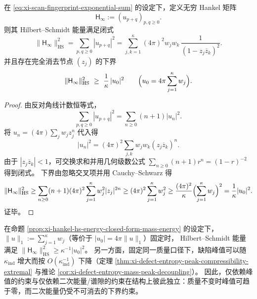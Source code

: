 \begin{proposition}\label{prop:xi-hankel-hs-energy-closed-form-mass-energy}
在 \eqref{eq:xi-scan-fingerprint-exponential-sum} 的设定下，定义无穷 Hankel 矩阵
\[
\mathsf H_\infty:=(u_{p+q})_{p,q\ge 0}.
\]
则其 Hilbert--Schmidt 能量满足闭式
\[
\|\mathsf H_\infty\|_{\mathrm{HS}}^2
=\sum_{p,q\ge 0}|u_{p+q}|^2
=\sum_{j,k=1}^{\kappa}(4\pi)^2 w_j w_k\,\frac{1}{(1-z_j\overline z_k)^2}.
\]
并且存在完全消去节点 \((z_j)\) 的下界
\[
\|\mathsf H_\infty\|_{\mathrm{HS}}^2\ \ge\ \frac{1}{\kappa}\,|u_0|^2
\qquad\Bigl(u_0=4\pi\sum_{j=1}^{\kappa}w_j\Bigr).
\]
\end{proposition}
\begin{proof}
由反对角线计数恒等式，
\[
\sum_{p,q\ge 0}|u_{p+q}|^2=\sum_{n\ge 0}(n+1)|u_n|^2.
\]
将 \(u_n=(4\pi)\sum_j w_j z_j^n\) 代入得
\[
|u_n|^2=(4\pi)^2\sum_{j,k}w_j w_k (z_j\overline z_k)^n.
\]
由于 \(|z_j\overline z_k|<1\)，可交换求和并用几何级数公式
\(
\sum_{n\ge 0}(n+1)r^n=(1-r)^{-2}
\)
得到闭式。
下界由忽略交叉项并用 Cauchy--Schwarz 得
\[
\|\mathsf H_\infty\|_{\mathrm{HS}}^2
\ge \sum_{n\ge 0}(n+1)(4\pi)^2\sum_{j=1}^{\kappa}w_j^2|z_j|^{2n}
\ge (4\pi)^2\sum_{j=1}^{\kappa}w_j^2
\ge \frac{(4\pi)^2}{\kappa}\Bigl(\sum_{j=1}^{\kappa}w_j\Bigr)^2
=\frac{1}{\kappa}|u_0|^2.
\]
证毕。
\end{proof}

\begin{corollary}[峰值与二次能量约束的独立性]\label{cor:xi-peak-vs-energy-audit-independence}
在命题 \ref{prop:xi-hankel-hs-energy-closed-form-mass-energy} 的设定下，
\(\|u\|_{1}:=\sum_{j=1}^{\kappa}w_j\)（等价于 \(|u_0|=4\pi\|u\|_1\)）固定时，
Hilbert--Schmidt 能量满足
\(
\|\mathsf H_\infty\|_{\mathrm{HS}}^2\ge \kappa^{-1}|u_0|^2
\)。
另一方面，固定同一质量口径下，缺陷峰值可以随 \(\kappa_{\mathrm{ind}}\) 增大而按 \(O(\kappa_{\mathrm{ind}}^{-1})\) 下降（定理 \ref{thm:xi-defect-entropy-peak-compressibility-extremal} 与推论 \ref{cor:xi-defect-entropy-mass-peak-decoupling}）。
因此，仅依赖峰值的约束与仅依赖二次能量/谱隙的约束在结构上彼此独立：质量不变时峰值可趋于零，而二次能量仍受不可消去的下界约束。
\end{corollary}

